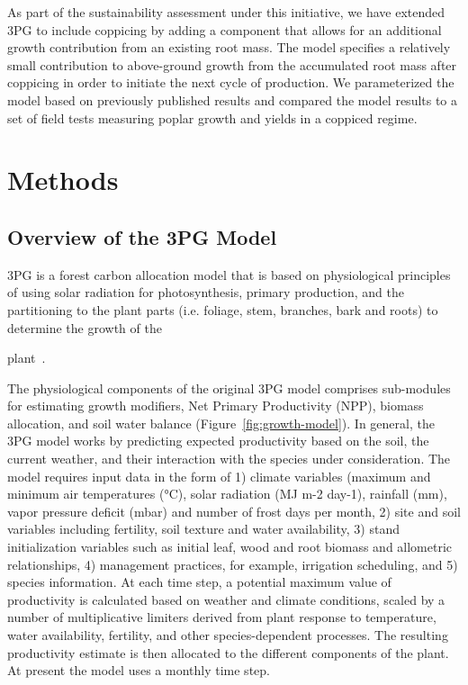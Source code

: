 \documentclass[10pt]{article}
\begin{document}
As part of the sustainability assessment under this initiative, we have extended
3PG to include coppicing by adding a component that allows for an additional
growth contribution from an existing root mass. The model specifies a relatively
small contribution to above-ground growth from the accumulated root mass after
coppicing in order to initiate the next cycle of production.  We parameterized
the model based on previously published results and compared the model results
to a set of field tests measuring poplar growth and yields in a coppiced regime.

\section*{Methods}

\subsection*{Overview of the 3PG Model}

3PG is a forest carbon allocation model that is based on physiological
principles of using solar radiation for photosynthesis, primary production, and
the partitioning to the plant parts (i.e. foliage, stem, branches, bark and
roots) to determine the growth of the

plant~\cite{Landsberg1997,landsberg2010physiological}. 

The physiological
components of the original 3PG model comprises sub-modules for estimating growth
modifiers, Net Primary Productivity (NPP), biomass allocation, and soil water
balance (Figure~\ref{fig:growth-model}).  In general, the 3PG model works by
predicting expected productivity based on the soil, the current weather, and
their interaction with the species under consideration.  The model requires
input data in the form of 1) climate variables (maximum and minimum air
temperatures (°C), solar radiation (MJ m-2 day-1), rainfall (mm), vapor pressure
deficit (mbar) and number of frost days per month, 2) site and soil variables
including fertility, soil texture and water availability, 3) stand
initialization variables such as initial leaf, wood and root biomass and
allometric relationships, 4) management practices, for example, irrigation
scheduling, and 5) species information. At each time step, a potential maximum
value of productivity is calculated based on weather and climate conditions,
scaled by a number of multiplicative limiters derived from plant response to
temperature, water availability, fertility, and other species-dependent
processes.  The resulting productivity estimate is then allocated to the
different components of the plant.  At present the model uses a monthly time
step.
\end{document}
